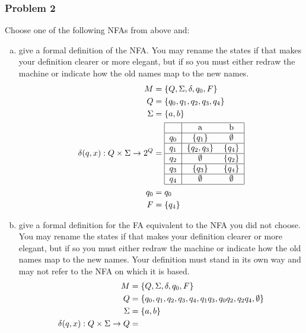 \documentclass[letterpaper, 12pt]{math}
\begin{document}
\subsubsection*{Problem 2}
Choose one of the following NFAs from above and:
\begin{enumerate}[(a)]
  \item give a formal definition of the NFA. You may rename the states if that
  makes your definition clearer or more elegant, but if so you must either
  redraw the machine or indicate how the old names map to the new names.
  \begin{align*}
    M &= \{Q,\Sigma,\delta,q_0,F\} \\
    Q &= \{q_0,q_1,q_2,q_3,q_4\} \\
    \Sigma &= \{a,b\} \\
    \delta(q,x):Q\times\Sigma\to2^{Q} &= \begin{tabular}{|c|cc|}
      \hline
          & a                 & b               \\ \hline
      \( q_0 \) & \( \{q_1\}     \) & \( \emptyset \) \\ \hline
      \( q_1 \) & \( \{q_2,q_3\} \) & \( \{q_4\}   \) \\ \hline
      \( q_2 \) & \( \emptyset   \) & \( \{q_2\}   \) \\ \hline
      \( q_3 \) & \( \{q_3\}     \) & \( \{q_4\}   \) \\ \hline
      \( q_4 \) & \( \emptyset   \) & \( \emptyset \) \\ \hline
    \end{tabular} \\
    q_0 &= q_0 \\
    F &= \{q_4\}
  \end{align*}
  \item give a formal definition for the FA equivalent to the NFA you did not
  choose. You may rename the states if that makes your definition clearer or
  more elegant, but if so you must either redraw the machine or indicate how
  the old names map to the new names. Your definition must stand in its own way
  and may not refer to the NFA on which it is based.
  \begin{align*}
    M &= \{Q,\Sigma,\delta,q_0,F\} \\
    Q &= \{q_0,q_1,q_2,q_3,q_4,q_1q_3,q_0q_2,q_2q_4,\emptyset\} \\
    \Sigma &= \{a,b\} \\
    \delta(q,x):Q\times\Sigma\to Q &= \begin{tabular}{|c|cc|}

\end{tabular}
\end{align*}
\end{enumerate}
\end{document}
